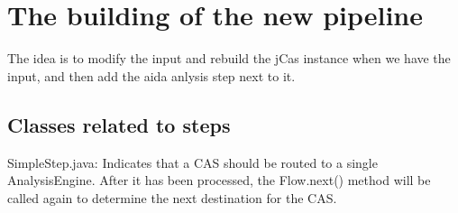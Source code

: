 \documentclass{article}
\begin{document}
\section{The building of the new pipeline}
The idea is to modify the input and rebuild the jCas instance when we have the input, and then add the aida anlysis step next to it. 
\subsection{Classes related to steps}
SimpleStep.java: Indicates that a CAS should be routed to a single AnalysisEngine. After it has been processed, the Flow.next() method will be called again to determine the next destination for the CAS.
\end{document}
